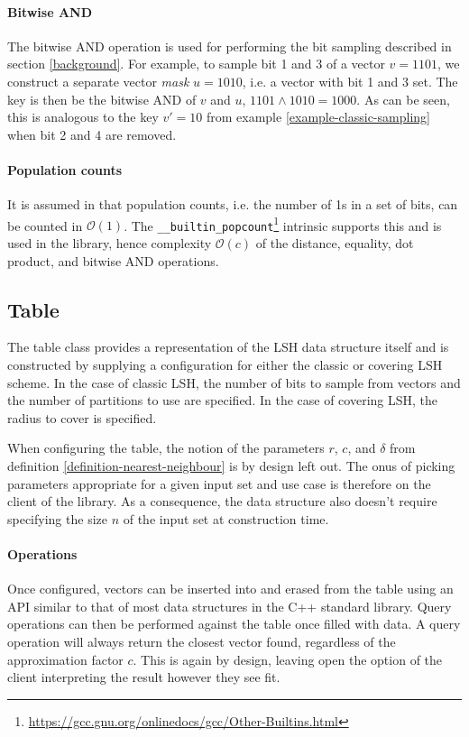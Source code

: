\paragraph{Bitwise AND} The bitwise AND operation is used for performing the bit sampling described in section \ref{background}. For example, to sample bit 1 and 3 of a vector $v = 1101$, we construct a separate vector \textit{mask} $u = 1010$, i.e. a vector with bit 1 and 3 set. The key is then be the bitwise AND of $v$ and $u$, $1101 \wedge 1010 = 1000$. As can be seen, this is analogous to the key $v' = 10$ from example \ref{example-classic-sampling} when bit 2 and 4 are removed.

\paragraph{Population counts} It is assumed in \cite{DBLP:journals/corr/Pagh15} that population counts, i.e. the number of 1s in a set of bits, can be counted in $\mathcal{O}(1)$. The \texttt{\_\_builtin\_popcount}\footnote{\url{https://gcc.gnu.org/onlinedocs/gcc/Other-Builtins.html}} intrinsic supports this and is used in the library, hence complexity $\mathcal{O}(c)$ of the distance, equality, dot product, and bitwise AND operations.

\subsection{Table}

The table class provides a representation of the LSH data structure itself and is constructed by supplying a configuration for either the classic or covering LSH scheme. In the case of classic LSH, the number of bits to sample from vectors and the number of partitions to use are specified. In the case of covering LSH, the radius to cover is specified.

When configuring the table, the notion of the parameters $r$, $c$, and $\delta$ from definition \ref{definition-nearest-neighbour} is by design left out. The onus of picking parameters appropriate for a given input set and use case is therefore on the client of the library. As a consequence, the data structure also doesn't require specifying the size $n$ of the input set at construction time.

\paragraph{Operations} Once configured, vectors can be inserted into and erased from the table using an API similar to that of most data structures in the C++ standard library. Query operations can then be performed against the table once filled with data. A query operation will always return the closest vector found, regardless of the approximation factor $c$. This is again by design, leaving open the option of the client interpreting the result however they see fit.

